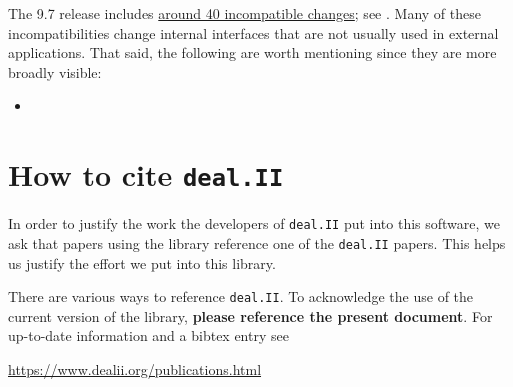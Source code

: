 \documentclass{ansarticle-preprint}
\newcommand{\specialword}[1]{\texttt{#1}}
\newcommand{\dealii}{{\specialword{deal.II}}\xspace}
\begin{document}
The 9.7 release includes
\href{https://dealii.org/developer/doxygen/deal.II/changes_between_9_5_2_and_9_6_0.html}
     {around 40 incompatible changes};
see \cite{changes97}. Many of these
incompatibilities change internal
interfaces that are not usually used in external
applications. That said, the following are worth mentioning since they
are more broadly visible:
\begin{itemize}
  \item {}
\end{itemize}



\section{How to cite \dealii}\label{sec:cite}

In order to justify the work the developers of \dealii put into this
software, we ask that papers using the library reference one of the
\dealii papers. This helps us justify the effort we put into this library.

There are various ways to reference \dealii. To acknowledge the use of
the current version of the library, \textbf{please reference the present
  document}. For up-to-date information and a bibtex entry
see
\begin{center}
  \url{https://www.dealii.org/publications.html}
\end{center}
\end{document}

